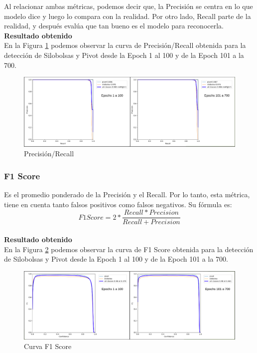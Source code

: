 Al relacionar ambas métricas, podemos decir que, la Precisión se centra en lo que modelo dice y luego lo compara con la realidad. Por otro lado, Recall parte de la realidad, y después evalúa que tan bueno es el modelo para reconocerla.\\
 
\textbf{Resultado obtenido}\\

En la Figura \ref{fig:precision/recall} podemos observar la curva de Precisión/Recall obtenida para la detección de Silobolsas y Pivot desde la Epoch 1 al 100 y de la Epoch 101 a la 700.\\

\begin{figure}[h!]
    \centering
    \includegraphics[width=1\textwidth]{img/Precision-Recall.png}
    \caption{Precisión/Recall}
    \label{fig:precision/recall}
\end{figure}

\newpage
\subsubsection{F1 Score}
Es el promedio ponderado de la Precisión y el Recall. Por lo tanto, esta métrica, tiene en cuenta tanto falsos positivos como falsos negativos. Su fórmula es:   \[F1 Score=2*\frac{Recall * Precision}{Recall + Precision}\] \\


\textbf{Resultado obtenido}\\

En la Figura \ref{fig:f1-score} podemos observar la curva de F1 Score obtenida para la detección de Silobolsas y Pivot desde la Epoch 1 al 100 y de la Epoch 101 a la 700.
\begin{figure}[h!]
    \centering
    \includegraphics[width=1\textwidth]{img/F1-Score.png}
    \caption{Curva F1 Score}
    \label{fig:f1-score}
\end{figure}



